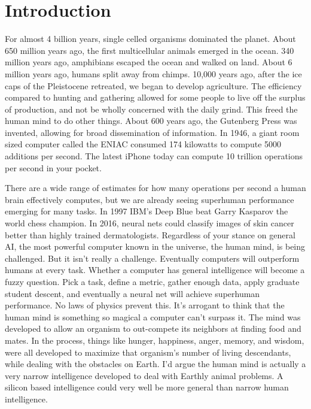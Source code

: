 \chapter{Introduction}
For almost 4 billion years, single celled organisms dominated the planet.  About 650 million years ago, the first multicellular animals emerged in the ocean.  340 million years ago, amphibians escaped the ocean and walked on land.  About 6 million years ago, humans split away from chimps.  10,000 years ago, after the ice caps of the Pleistocene retreated, we began to develop agriculture.  The efficiency compared to hunting and gathering allowed for some people to live off the surplus of production, and not be wholly concerned with the daily grind.  This freed the human mind to do other things.  About 600 years ago, the Gutenberg Press was invented, allowing for broad dissemination of information.  In 1946, a giant room sized computer called the ENIAC consumed 174 kilowatts to compute 5000 additions per second.  The latest iPhone today can compute 10 trillion operations per second in your pocket.  

There are a wide range of estimates for how many operations per second a human brain effectively computes, but we are already seeing superhuman performance emerging for many tasks.  In 1997 IBM's Deep Blue beat Garry Kasparov the world chess champion.  In 2016, neural nets could classify images of skin cancer better than highly trained dermatologists.  Regardless of your stance on general AI, the most powerful computer known in the universe, the human mind, is being challenged.  But it isn't really a challenge.  Eventually computers will outperform humans at every task.  Whether a computer has general intelligence will become a fuzzy question.  Pick a task, define a metric, gather enough data, apply graduate student descent, and eventually a neural net will achieve superhuman performance.  No laws of physics prevent this.  It's arrogant to think that the human mind is something so magical a computer can't surpass it.  The mind was developed to allow an organism to out-compete its neighbors at finding food and mates.  In the process, things like hunger, happiness, anger, memory, and wisdom, were all developed to maximize that organism's number of living descendants, while dealing with the obstacles on Earth.  I'd argue the human mind is actually a very narrow intelligence developed to deal with Earthly animal problems.  A silicon based intelligence could very well be more general than narrow human intelligence.

